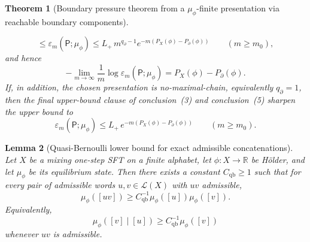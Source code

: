 \documentclass{etds}%
\numberwithin{equation}{section}
\theoremstyle{plain}
\newtheorem{theorem}{Theorem}[section]
\newtheorem{lemma}[theorem]{Lemma}
\theoremstyle{definition}
\theoremstyle{remark}
\begin{document}
\begin{theorem}[Boundary pressure theorem from a $\mu_\phi$-finite presentation via reachable boundary components]
\begin{enumerate}[label=(\arabic*),resume*]
\[  \le \varepsilon_m(\mathsf{P};\mu_\phi)
  \le
  L_+\,m^{q_\partial-1}e^{-m(P_X(\phi)-P_\partial(\phi))}
  \qquad(m\ge m_0),
  \]
  and hence
  \[
  -\lim_{m\to\infty}\frac1m\log\varepsilon_m(\mathsf{P};\mu_\phi)
  =P_X(\phi)-P_\partial(\phi).
  \]
  If, in addition, the chosen presentation is no-maximal-chain, equivalently
  $q_\partial=1$, then the final upper-bound clause of conclusion~\emph{(3)}
  and conclusion~\emph{(5)} sharpen the upper bound to
  \[
  \varepsilon_m(\mathsf{P};\mu_\phi)
  \le L_+\,e^{-m(P_X(\phi)-P_\partial(\phi))}
  \qquad(m\ge m_0).
  \]
\end{enumerate}
\end{theorem}

\begin{lemma}[Quasi-Bernoulli lower bound for exact admissible concatenations]
\label{lem:qb-exact-concat}
Let $X$ be a mixing one-step SFT on a finite alphabet, let
$\phi:X\to\mathbb{R}$ be H\"older, and let $\mu_\phi$ be its equilibrium
state.  Then there exists a constant $C_{\mathrm{qb}}\ge 1$ such that for
every pair of admissible words $u,v\in\mathcal{L}(X)$ with $uv$ admissible,
\[
\mu_\phi([uv])\ge C_{\mathrm{qb}}^{-1}\mu_\phi([u])\mu_\phi([v]).
\]
Equivalently,
\[
\mu_\phi([v]\mid [u])\ge C_{\mathrm{qb}}^{-1}\mu_\phi([v])
\]
whenever $uv$ is admissible.
\end{lemma}
\end{document}
